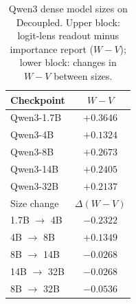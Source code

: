 \begin{table}[t]
\centering
\caption{Qwen3 dense model sizes on Decoupled. Upper block: logit-lens readout minus importance report
($W{-}V$); lower block: changes in $W{-}V$ between sizes. }
\label{tab:scale}
\small
\setlength{\tabcolsep}{8pt}
\begin{tabular}{lc}
\toprule
Checkpoint & $W{-}V$ \\
\midrule
Qwen3-1.7B & $+0.3646$ \\
Qwen3-4B & $+0.1324$ \\
Qwen3-8B & $+0.2673$ \\
Qwen3-14B & $+0.2405$ \\
Qwen3-32B & $+0.2137$ \\
\midrule
Size change & $\Delta(W{-}V)$ \\
\midrule
1.7B $\rightarrow$ 4B & $-0.2322$ \\
4B $\rightarrow$ 8B & $+0.1349$ \\
8B $\rightarrow$ 14B & $-0.0268$ \\
14B $\rightarrow$ 32B & $-0.0268$ \\
8B $\rightarrow$ 32B & $-0.0536$ \\
\bottomrule
\end{tabular}
\end{table}
